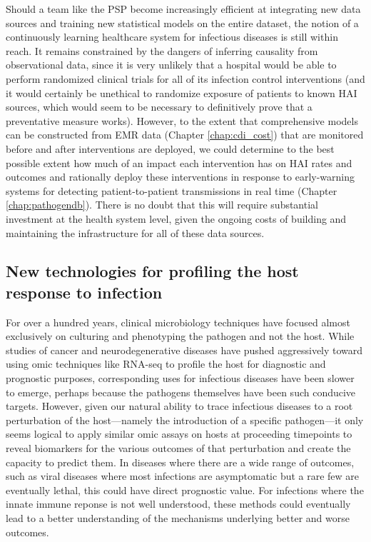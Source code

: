 Should a team like the PSP become increasingly efficient at integrating new data sources and training new statistical models on the entire dataset, the notion of a continuously learning healthcare system for infectious diseases is still within reach. It remains constrained by the dangers of inferring causality from observational data,\autocite{Dahabreh2014} since it is very unlikely that a hospital would be able to perform randomized clinical trials for all of its infection control interventions (and it would certainly be unethical to randomize exposure of patients to known HAI sources, which would seem to be necessary to definitively prove that a preventative measure works). However, to the extent that comprehensive models can be constructed from EMR data (Chapter \ref{chap:cdi_cost}) that are monitored before and after interventions are deployed, we could determine to the best possible extent how much of an impact each intervention has on HAI rates and outcomes and rationally deploy these interventions in response to early-warning systems for detecting patient-to-patient transmissions in real time (Chapter \ref{chap:pathogendb}). There is no doubt that this will require substantial investment at the health system level, given the ongoing costs of building and maintaining the infrastructure for all of these data sources.

\subsection{New technologies for profiling the host response to infection}

For over a hundred years, clinical microbiology techniques have focused almost exclusively on culturing and phenotyping the pathogen and not the host.\autocite{Didelot2012} While studies of cancer and neurodegenerative diseases have pushed aggressively toward using omic techniques like RNA-seq to profile the host for diagnostic and prognostic purposes,\autocite{Costa2012} corresponding uses for infectious diseases have been slower to emerge, perhaps because the pathogens themselves have been such conducive targets. However, given our natural ability to trace infectious diseases to a root perturbation of the host—namely the introduction of a specific pathogen—it only seems logical to apply similar omic assays on hosts at proceeding timepoints to reveal biomarkers for the various outcomes of that perturbation and create the capacity to predict them. In diseases where there are a wide range of outcomes, such as viral diseases where most infections are asymptomatic but a rare few are eventually lethal, this could have direct prognostic value. For infections where the innate immune reponse is not well understood, these methods could eventually lead to a better understanding of the mechanisms underlying better and worse outcomes.


